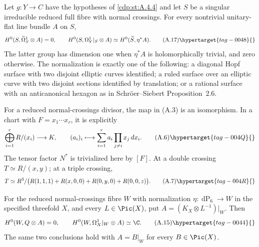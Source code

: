 
\begin{proposition}\hypertarget{tag-01AU}{}\label{cdp:st:A.4.5}


Let $g:Y\to C$ have the hypotheses of \ref{cdp:st:A.4.4} and let $S$ be a singular irreducible reduced full fibre with normal crossings. For every nontrivial unitary-flat line bundle $A$ on $S$,
\[
H^0(S,\widetilde\Omega_S^1\otimes A)=0,
\qquad
H^0(S,\Omega_Y^1|_S\otimes A)
 \simeq H^0(\widetilde S,\eta^*A).
\tag{A.17}\hypertarget{tag-0048}{}\label{cdp:eq:A.17}
\]
The latter group has dimension one when $\eta^*A$ is holomorphically trivial, and zero otherwise. The normalization is exactly one of the following: a diagonal Hopf surface with two disjoint elliptic curves identified; a ruled surface over an elliptic curve with two disjoint sections identified by translation; or a rational surface with an anticanonical hexagon as in Schr\"oer--Siebert Proposition~2.6.
\end{proposition}

\begin{proposition}\hypertarget{tag-01AE}{}\label{cdp:st:A.1.2}


For a reduced normal-crossings divisor, the map in (A.3) is an isomorphism. In a chart with $F=x_1\cdots x_r$, it is explicitly
\[
 \bigoplus_{i=1}^r R/(x_i)\longrightarrow K,
 \qquad (a_i)_i\longmapsto
 \sum_{i=1}^r a_i\prod_{j\ne i}x_j\,dx_i.
\tag{A.6}\hypertarget{tag-004Q}{}\label{cdp:eq:A.6}
\]
The tensor factor $N^*$ is trivialized here by $[F]$. At a double crossing $T\simeq R/(x,y)$; at a triple crossing,
\[
 T\simeq R^3/\bigl(R(1,1,1)+R(x,0,0)+R(0,y,0)+R(0,0,z)\bigr).
\tag{A.7}\hypertarget{tag-004R}{}\label{cdp:eq:A.7}
\]
\end{proposition}

\begin{proposition}\hypertarget{tag-01AQ}{}\label{cdp:st:A.4.1}


For the reduced normal-crossings fibre $W$ with normalization $\eta:\operatorname{dP}_6\to W$ in the specified threefold $X$, and every $L\in\Pic(X)$, put $A=(K_X\otimes L^{-1})|_W$. Then
\[
H^0(W,Q\otimes A)=0,
\qquad H^0(W,\Omega_X^1|_W\otimes A)\simeq\C.
\tag{A.15}\hypertarget{tag-0044}{}\label{cdp:eq:A.15}
\]
The same two conclusions hold with $A=B|_W$ for every $B\in\Pic(X)$.
\end{proposition}

